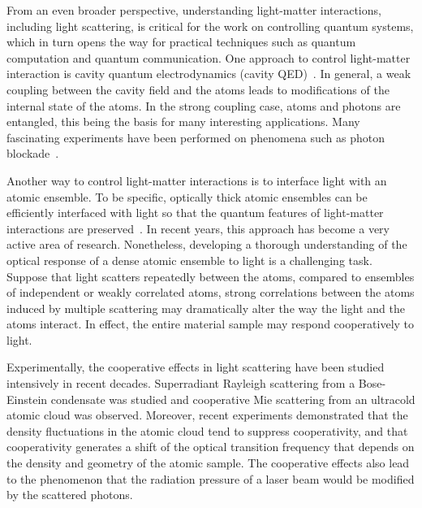 From an even broader perspective, understanding light-matter interactions, including light scattering, is critical for the work on controlling quantum systems, which in turn opens the way for practical techniques such as quantum computation and quantum communication. One approach to control light-matter interaction is cavity quantum electrodynamics (cavity QED)~\cite{0034-4885-69-5-R02}. In general, a weak coupling between the cavity field and the atoms leads to modifications of the internal state of the atoms. In the strong coupling case, atoms and photons are entangled, this being the basis for many interesting applications.  Many fascinating experiments have been performed on phenomena such as  photon blockade~\cite{photon_blockade}.

Another way to control light-matter interactions is to interface light with an atomic ensemble. To be specific,  optically thick atomic ensembles can be efficiently interfaced with light so that the quantum features of light-matter interactions are preserved~\cite{RevModPhys.82.1041}. In recent years, this approach has become a very active area of research. Nonetheless, developing a thorough understanding of the optical response of a dense atomic ensemble to light is a challenging task. Suppose that light scatters repeatedly between the atoms, compared to ensembles of independent or weakly correlated atoms, strong correlations between the atoms induced by multiple scattering may dramatically alter the way the light and the atoms interact.  In effect, the entire material sample may respond cooperatively to light.

Experimentally, the cooperative effects in light scattering have been studied intensively in recent decades.  Superradiant Rayleigh scattering from a Bose-Einstein condensate was studied\cite{Inouye23071999,PhysRevLett.83.5202,PhysRevA.62.063615} and cooperative Mie scattering from an ultracold atomic cloud was observed\cite{PhysRevA.82.011404}. Moreover, recent experiments demonstrated that the density fluctuations in the atomic cloud tend to suppress cooperativity\cite{PhysRevLett.104.183602}, and that cooperativity generates a shift of the optical transition frequency that depends on the density and geometry of the atomic sample\cite{PhysRevLett.108.173601}. The cooperative effects also lead to the phenomenon that the radiation pressure of a laser beam would be modified by the scattered photons\cite{Eur.Phys.J.D.58.1}.

